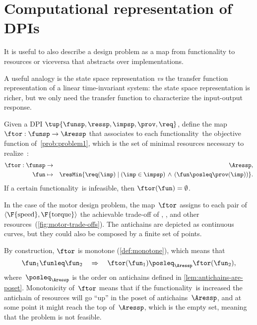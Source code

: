 \section{Computational representation of DPIs}
\label{sec:solving-representation-of-dpis}

It is useful to also describe a design problem as a map from functionality to resources or viceversa that abstracts over implementations.

A useful analogy is the state space representation \emph{vs} the transfer function representation of a linear time-invariant system: the state space representation is richer, but we only need the transfer function to characterize the input-output response.


\begin{definition}
    \label{def:ftor}
    Given a DPI $\tup{ \funsp,\ressp,\impsp,\prov,\req} $,
    define the map~$\ftor:\funsp\rightarrow\Aressp$ that associates
    to each functionality~\fun the objective function of~\cref{prob:problem1},
    which is the set of minimal resources necessary to realize~\fun:
    \begin{eqnarray*}
        \ftor:\funsp & \rightarrow & \Aressp,\\
        \fun& \mapsto & \resMin\{\req(\imp)\mid\left(\imp\in\impsp\right)\,\wedge\,\left(\fun\posleq\prov(\imp)\right)\}.
    \end{eqnarray*}
    If a certain functionality~\fun is infeasible, then $\ftor(\fun)=\emptyset$.
\end{definition}



\begin{example}
    In the case of the motor design problem, the map~$\ftor$ assigns
    to each pair of $\left\langle \F{\text{speed}},\F{\text{torque}}\right\rangle $
    the achievable trade-off of , , and other resources~(\cref{fig:motor-trade-offs}).
    The antichains are depicted as continuous curves, but they could also
    be composed by a finite set of points.

\end{example}


By construction, $\ftor$ is monotone (\cref{def:monotone}), which means that
\[
    \fun_{1}\funleq\fun_{2}\quad\Rightarrow\quad\ftor(\fun_{1})\posleq_{\Aressp}\ftor(\fun_{2}),
\]
where~$\posleq_{\Aressp}$ is the order on antichains defined in
\cref{lem:antichains-are-poset}.
Monotonicity of~$\ftor$ means that if the functionality~\fun is increased the antichain of resources will go ``up'' in the poset of antichains~$\Aressp$, and at some point it might reach the top of~$\Aressp$, which is the empty set, meaning that the problem is not feasible.




